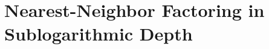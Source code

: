 \chapter{Nearest-Neighbor Factoring in Sublogarithmic Depth}
\label{chap:factor-sublog}









%

